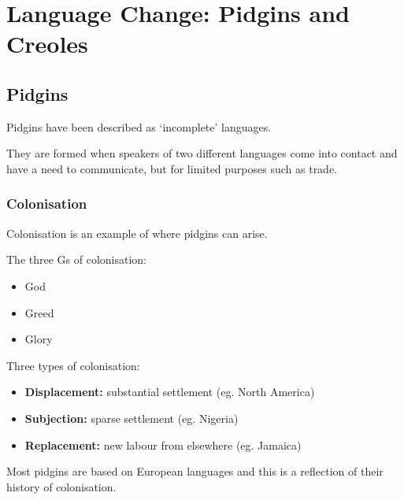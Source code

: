\documentclass[../main.tex]{subfiles}
\begin{document}
    \section{Language Change: Pidgins and Creoles}

    \subsection{Pidgins}
    Pidgins have been described as `incomplete' languages. \par
    They are formed when speakers of two different languages come into contact and have a need to communicate, but for limited purposes such as trade. \par

    \subsubsection{Colonisation}
    Colonisation is an example of where pidgins can arise. \par
    
    The three Gs of colonisation:
    \begin{itemize}
        \item God
        \item Greed
        \item Glory
    \end{itemize}

    Three types of colonisation: 
    \begin{itemize}
        \item \textbf{Displacement:} substantial settlement (eg. North America)
        \item \textbf{Subjection:} sparse settlement (eg. Nigeria)
        \item \textbf{Replacement:} new labour from elsewhere (eg. Jamaica)
    \end{itemize}
    Most pidgins are based on European languages and this is a reflection of their history of colonisation.

\end{document}
